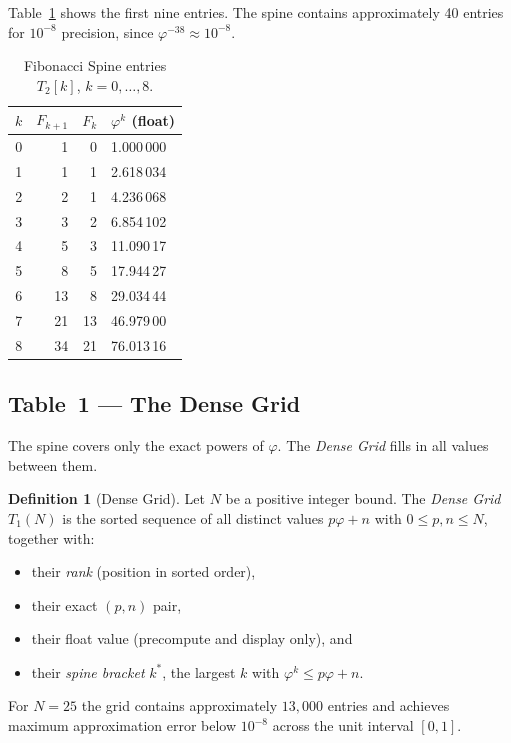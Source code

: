 \documentclass[12pt]{article}
\theoremstyle{definition}
\newtheorem{definition}[theorem]{Definition}
\theoremstyle{remark}
\begin{document}
\medskip
Table~\ref{tab:spine} shows the first nine entries.  The spine contains
approximately 40 entries for $10^{-8}$ precision, since
$\varphi^{-38} \approx 10^{-8}$.

\begin{table}[h]
\centering
\caption{Fibonacci Spine entries $T_2[k]$, $k = 0,\ldots,8$.}
\label{tab:spine}
\begin{tabular}{rrrl}
\toprule
$k$ & $F_{k+1}$ & $F_k$ & $\varphi^k$ (float) \\
\midrule
0 & 1 & 0 & 1.000\,000 \\
1 & 1 & 1 & 2.618\,034 \\
2 & 2 & 1 & 4.236\,068 \\
3 & 3 & 2 & 6.854\,102 \\
4 & 5 & 3 & 11.090\,17 \\
5 & 8 & 5 & 17.944\,27 \\
6 & 13& 8 & 29.034\,44 \\
7 & 21& 13& 46.979\,00 \\
8 & 34& 21& 76.013\,16 \\
\bottomrule
\end{tabular}
\end{table}

\subsection{Table~1 — The Dense Grid}

The spine covers only the exact powers of $\varphi$.  The \emph{Dense
Grid} fills in all values between them.

\begin{definition}[Dense Grid]
Let $N$ be a positive integer bound.  The \emph{Dense Grid}
$T_1(N)$ is the sorted sequence of all distinct values
$p\varphi + n$ with $0 \leq p,n \leq N$, together with:
\begin{itemize}[nosep]
  \item their \emph{rank} (position in sorted order),
  \item their exact $(p,n)$ pair,
  \item their float value (precompute and display only), and
  \item their \emph{spine bracket} $k^*$, the largest $k$ with
        $\varphi^k \leq p\varphi+n$.
\end{itemize}
\end{definition}

For $N = 25$ the grid contains approximately $13{,}000$ entries and
achieves maximum approximation error below $10^{-8}$ across the unit
interval $[0,1]$.
\end{document}
